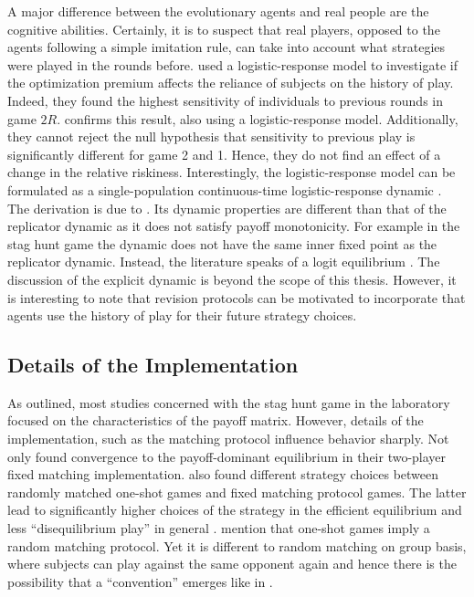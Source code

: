A major difference between the evolutionary agents and 
real people are the cognitive abilities.
Certainly, it is to suspect that real players, opposed to the agents
following a simple imitation rule, can take into account what strategies 
were played in the rounds before.
\textcite{battalio_optimization_2001} used a logistic-response model to
investigate if the optimization premium affects the reliance of subjects
on the history of play. Indeed, they found the highest sensitivity of 
individuals to previous rounds in game $2R$.
\textcite{dubois_optimization_2012} confirms this result, also using 
a logistic-response model. Additionally, they cannot reject the null
hypothesis that sensitivity to previous play is significantly different for
game 2 and 1. Hence, they do not find an effect of a change in the
relative riskiness. Interestingly, the logistic-response model can be
formulated as a single-population continuous-time logistic-response dynamic
\parencite[752]{battalio_optimization_2001}. The derivation is due to
\textcite{fudenberg_theory_1998}. Its dynamic properties are different
than that of the replicator dynamic as it does not satisfy payoff monotonicity.
For example in the stag hunt game the dynamic does not have the same inner
fixed point as the replicator dynamic. Instead, the literature speaks
of a logit equilibrium \parencite{battalio_optimization_2001}. The discussion
of the explicit dynamic is beyond the scope of this thesis. 
However, it is interesting to note that revision protocols can be motivated 
to incorporate that agents use the history of play for their future strategy
choices.

\subsection{Details of the Implementation}
As outlined, most studies concerned with the stag hunt game in the 
laboratory focused on the characteristics of the payoff matrix. 
However, details of the implementation,
such as the matching protocol influence behavior sharply. Not only 
\textcite{van_huyck_tacit_1990} found 
convergence to the payoff-dominant equilibrium in their two-player 
fixed matching implementation.  
\textcite{clark_repetition_2001} also found different strategy 
choices between randomly matched one-shot games and fixed matching protocol 
games. The latter lead to significantly higher choices of the strategy 
in the efficient equilibrium and less ``disequilibrium play'' in general
\parencite[]{clark_repetition_2001}. 
\textcite{devetag_when_2007} mention that one-shot games imply a 
random matching protocol. Yet it is different to random matching on group
basis, where subjects can play against the same opponent again 
and hence there is the possibility that a ``convention'' emerges like in 
\textcite{rankin_strategic_2000}.

